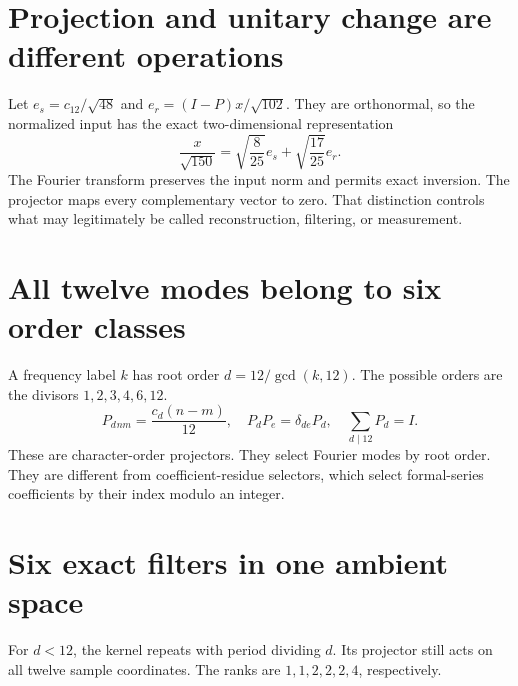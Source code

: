 \clearpage\section*{Projection and unitary change are different operations}
Let $e_s=c_{12}/\sqrt{48}$ and $e_r=(I-P)x/\sqrt{102}$. They are orthonormal, so the normalized input has the exact two-dimensional representation
\[
 \frac{x}{\sqrt{150}}=\sqrt{\frac8{25}}e_s+\sqrt{\frac{17}{25}}e_r.
\]
The Fourier transform preserves the input norm and permits exact inversion. The projector maps every complementary vector to zero. That distinction controls what may legitimately be called reconstruction, filtering, or measurement.

\clearpage\section*{All twelve modes belong to six order classes}
A frequency label $k$ has root order $d=12/\gcd(k,12)$. The possible orders are the divisors $1,2,3,4,6,12$.
\[
 P_d{}_{nm}=\frac{c_d(n-m)}{12},\quad
 P_dP_e=\delta_{de}P_d,\quad
 \sum_{d\mid12}P_d=I.
\]
These are character-order projectors. They select Fourier modes by root order. They are different from coefficient-residue selectors, which select formal-series coefficients by their index modulo an integer.

\clearpage\section*{Six exact filters in one ambient space}
For $d<12$, the kernel repeats with period dividing $d$. Its projector still acts on all twelve sample coordinates. The ranks are $1,1,2,2,2,4$, respectively.

